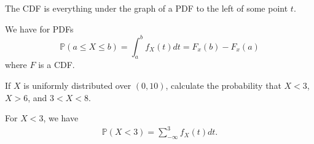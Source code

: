 
\begin{definition}
	The CDF is everything under the graph of a PDF to the left of some point \( t \).
\end{definition}

\begin{theorem}
	We have for PDFs
	\[ \mathbb{P}(a\le X\le b) = \int_{a}^{b}f_X(t) dt = F_x(b) - F_x(a)\]
	where \( F \) is a CDF.
\end{theorem}

\begin{eg}
	If \( X \) is uniformly distributed over \( (0, 10) \), calculate the probability that \( X<3 \), \( X>6 \), and \( 3<X<8 \).
\end{eg}
\begin{explanation}
	For \( X<3 \), we have 
	\begin{align*}
		\mathbb{P}(X < 3) = \sum_{-\infty}^{3} f_X(t) dt
	.\end{align*}
\end{explanation}

